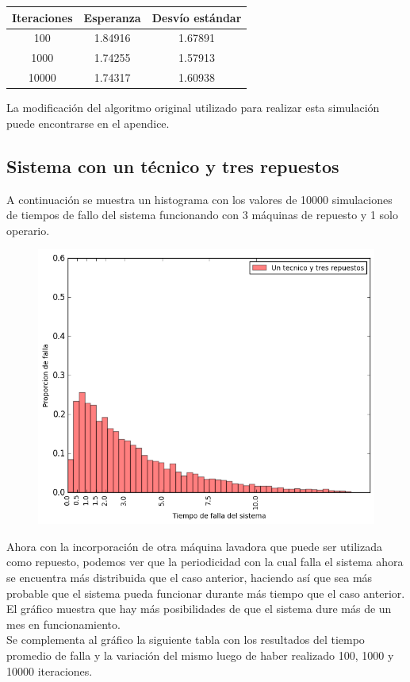\documentclass[10pt,a4paper]{article} %
\begin{document}
    \begin{center}
        \begin{tabular}{ c| c| c}
            Iteraciones & Esperanza & Desv\'io est\'andar \\ \hline
            100&    1.84916 & 1.67891 \\ \hline
            1000&   1.74255 & 1.57913 \\ \hline
            10000&  1.74317 & 1.60938 \\ \hline
        \end{tabular}
    \end{center}
    
    La modificaci\'on del algoritmo original utilizado para realizar esta simulaci\'on puede encontrarse en el apendice.
    
    \subsection{Sistema con un t\'ecnico y tres repuestos}
    A continuaci\'on se muestra un histograma con los valores de 10000 simulaciones de tiempos de fallo del sistema funcionando con 3 m\'aquinas de repuesto y 1 solo operario.
    \begin {figure}[!htb]
    \centering
    \includegraphics[width=12cm] {img/1op3rep}
    \end {figure}

    Ahora con la incorporaci\'on de otra m\'aquina lavadora que puede ser utilizada como repuesto, podemos ver que la periodicidad con la cual falla el sistema ahora se encuentra m\'as distribuida que el caso anterior, haciendo as\'i que sea m\'as probable que el sistema pueda funcionar durante m\'as tiempo que el caso anterior. El gr\'afico muestra que hay m\'as posibilidades de que el sistema dure m\'as de un mes en funcionamiento. \\
    Se complementa al gr\'afico la siguiente tabla con los resultados del tiempo promedio de falla y la variaci\'on del mismo luego de haber realizado 100, 1000 y 10000 iteraciones.
    
\end{document}
